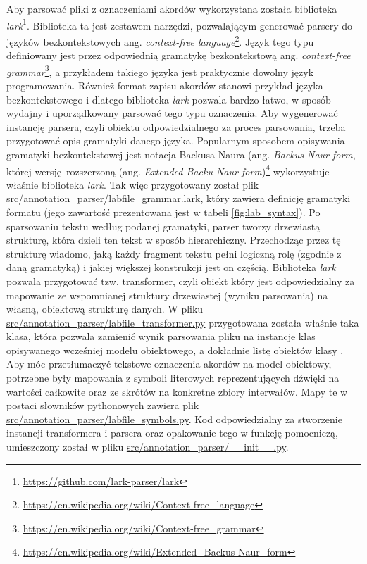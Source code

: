 Aby parsować pliki z oznaczeniami akordów wykorzystana została biblioteka
\emph{lark}\footnote{\url{https://github.com/lark-parser/lark}}. Biblioteka ta jest zestawem narzędzi,
pozwalającym generować parsery do języków bezkontekstowych ang. \emph{context-free
language}\footnote{\url{https://en.wikipedia.org/wiki/Context-free_language}}. Język tego typu definiowany
jest przez odpowiednią gramatykę bezkontekstową ang. \emph{context-free
grammar}\footnote{\url{https://en.wikipedia.org/wiki/Context-free_grammar}}, a przykładem takiego języka
jest praktycznie dowolny język programowania. Również format zapisu akordów stanowi przykład języka
bezkontekstowego i dlatego biblioteka \emph{lark} pozwala bardzo łatwo, w sposób wydajny i
uporządkowany parsować tego typu oznaczenia. Aby wygenerować instancję parsera, czyli obiektu
odpowiedzialnego za proces parsowania, trzeba przygotować opis gramatyki danego języka. Popularnym
sposobem opisywania gramatyki bezkontekstowej jest notacja Backusa-Naura (ang. \emph{Backus-Naur
form}, której wersję rozszerzoną (ang. \emph{Extended Backu-Naur
form})\footnote{\url{https://en.wikipedia.org/wiki/Extended_Backus-Naur_form}} wykorzystuje właśnie
biblioteka \emph{lark}. Tak więc przygotowany został plik
\url{src/annotation_parser/labfile_grammar.lark}, który zawiera definicję gramatyki formatu
 (jego zawartość prezentowana jest w tabeli \ref{fig:lab_syntax}). Po sparsowaniu tekstu
według podanej gramatyki, parser tworzy drzewiastą strukturę, która dzieli ten tekst w sposób
hierarchiczny. Przechodząc przez tę strukturę wiadomo, jaką każdy fragment tekstu pełni logiczną
rolę (zgodnie z daną gramatyką) i jakiej większej konstrukcji jest on częścią. Biblioteka
\emph{lark} pozwala przygotować tzw. transformer, czyli obiekt który jest odpowiedzialny za
mapowanie ze wspomnianej struktury drzewiastej (wyniku parsowania) na własną, obiektową strukturę
danych. W pliku \url{src/annotation_parser/labfile_transformer.py} przygotowana została właśnie taka
klasa, która pozwala zamienić wynik parsowania pliku  na instancje klas opisywanego
wcześniej modelu obiektowego, a dokładnie listę obiektów klasy . Aby móc
przetłumaczyć tekstowe oznaczenia akordów na model obiektowy, potrzebne były mapowania z symboli
literowych reprezentujących dźwięki na wartości całkowite oraz ze skrótów na konkretne zbiory
interwałów. Mapy te w postaci słowników pythonowych zawiera plik
\url{src/annotation_parser/labfile_symbols.py}. Kod odpowiedzialny za stworzenie instancji
transformera i parsera oraz opakowanie tego w funkcję pomocniczą, umieszczony został w pliku
\url{src/annotation_parser/__init__.py}. 

